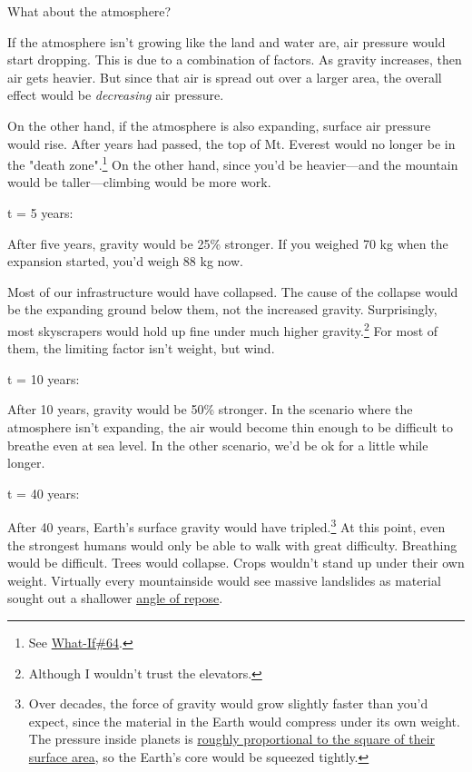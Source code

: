 {{What about the atmosphere?}

{If the atmosphere isn't growing like the land and water are, air pressure would start dropping. This is due to a combination of factors. As gravity increases, then air gets heavier. But since that air is spread out over a larger area, the overall effect would be \emph{decreasing} air pressure.}

{On the other hand, if the atmosphere is also expanding, surface air pressure would rise. After years had passed, the top of Mt. Everest would no longer be in the "death zone".{\footnote{See \href{http://what-if.xkcd.com/64/}{What-If\#64}.} } On the other hand, since you'd be heavier—and the mountain would be taller—climbing would be more work.}

{t = 5 years:}

{After five years, gravity would be 25\% stronger. If you weighed 70 kg when the expansion started, you'd weigh 88 kg now.}

{Most of our infrastructure would have collapsed. The cause of the collapse would be the expanding ground below them, not the increased gravity. Surprisingly, most skyscrapers would hold up fine under much higher gravity.{\footnote{Although I wouldn't trust the elevators.} } For most of them, the limiting factor isn't weight, but wind.}

{t = 10 years:}

{After 10 years, gravity would be 50\% stronger. In the scenario where the atmosphere isn't expanding, the air would become thin enough to be difficult to breathe even at sea level. In the other scenario, we'd be ok for a little while longer.}

{t = 40 years:}

{After 40 years, Earth's surface gravity would have tripled.{\footnote{Over decades, the force of gravity would grow slightly faster than you'd expect, since the material in the Earth would compress under its own weight. The pressure inside planets is \href{http://cseligman.com/text/planets/internalpressure.htm}{roughly proportional to the square of their surface area}, so the Earth's core would be squeezed tightly.} } At this point, even the strongest humans would only be able to walk with great difficulty. Breathing would be difficult. Trees would collapse. Crops wouldn't stand up under their own weight. Virtually every mountainside would see massive landslides as material sought out a shallower \href{https://en.wikipedia.org/wiki/Angle\_of\_repose} {angle of repose}.}

}

